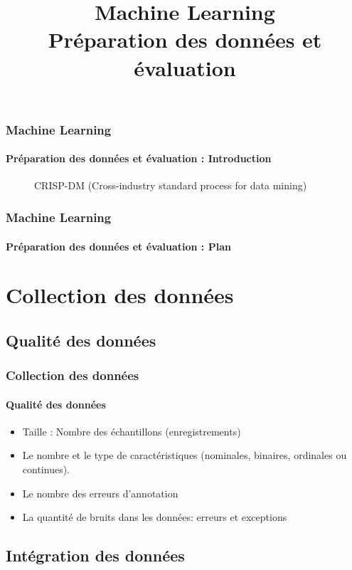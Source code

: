 \documentclass[xcolor=table]{beamer}
\title[ML : Préparation des données et évaluation] %
{Machine Learning \\Préparation des données et évaluation}
\begin{document}
	
\begin{frame}
	\frametitle{Machine Learning}
	\framesubtitle{Préparation des données et évaluation : Introduction}
	
	\begin{figure}
		\centering
		\caption{CRISP-DM (Cross-industry standard process for data mining)}
	\end{figure}
	
\end{frame}


\begin{frame}
	\frametitle{Machine Learning}
	\framesubtitle{Préparation des données et évaluation : Plan}
	
	\begin{multicols}{2}
		\tableofcontents
	\end{multicols}
\end{frame}

\section{Collection des données}

\subsection{Qualité des données}

\begin{frame}
\frametitle{Collection des données}
\framesubtitle{Qualité des données}

\begin{itemize}
	\item Taille : Nombre des échantillons (enregistrements)
	\item Le nombre et le type de caractéristiques (nominales, binaires, ordinales ou continues).
	\item Le nombre des erreurs d'annotation
	\item La quantité de bruits dans les données: erreurs et exceptions
\end{itemize}

\end{frame}


\subsection{Intégration des données}
\end{document}
